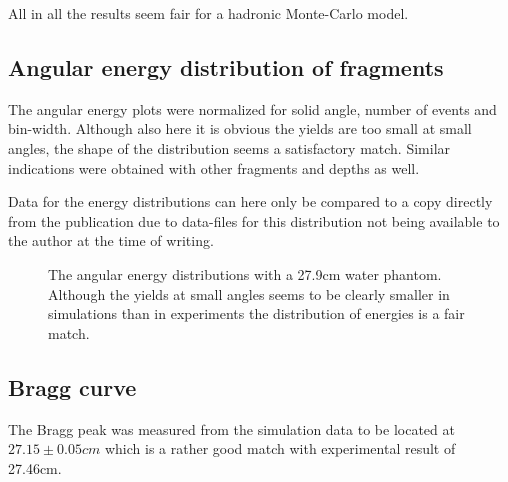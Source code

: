 All in all the results seem fair for a hadronic Monte-Carlo model.

\subsection{Angular energy distribution of fragments}

The angular energy plots were normalized for solid angle, number of events and bin-width. Although also here it is obvious the yields are too small at small angles, the shape of the distribution seems a satisfactory match. Similar indications were obtained with other fragments and depths as well.

Data for the energy distributions can here only be compared to a copy directly from the publication due to 
data-files for this distribution not being available to the author at the time of writing.

\begin{figure}[!ht]
\centering
{}
\label{fig:subfigureExample}
\caption[Optional caption for list of figures]{The angular energy distributions with a 27.9cm water phantom. Although the yields at small angles seems to be clearly smaller in simulations than in experiments the distribution of energies is a fair match.}
\end{figure}

\subsection{Bragg curve}
The Bragg peak was measured from the simulation data to be located at $27.15 \pm 0.05 cm$ which is a rather good match with experimental result of 27.46cm.

